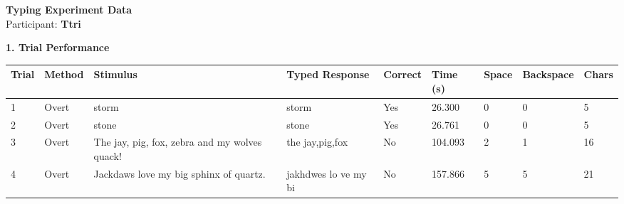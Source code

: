 \documentclass[10pt,a4paper]{article}
\begin{document}

\begin{center}
    {\Large\bfseries Typing Experiment Data}\\
    \vspace{2pt}
    Participant: \textbf{Ttri}
\end{center}

\vspace{0.25cm}


\noindent
{\large\bfseries 1. Trial Performance}

\vspace{0.08cm}

\begin{center}
\begin{tabularx}{\textwidth}{
    C{0.45in}
    C{0.65in}
    L{2.35in}
    L{2.55in}
    C{0.65in}
    C{0.65in}
    C{0.55in}
    C{0.75in}
    C{0.55in}
}
\toprule

\textbf{Trial} &
\textbf{Method} &
\textbf{Stimulus} &
\textbf{Typed Response} &
\textbf{Correct} &
\textbf{Time (s)} &
\textbf{Space} &
\textbf{Backspace} &
\textbf{Chars}
\\

\midrule

1 &
Overt &
storm &
storm &
Yes &
26.300 &
0 &
0 &
5
\\

2 &
Overt &
stone &
stone &
Yes &
26.761 &
0 &
0 &
5
\\

3 &
Overt &
The jay, pig, fox, zebra and my wolves quack! &
the  jay,pig,fox &
No &
104.093 &
2 &
1 &
16
\\

4 &
Overt &
Jackdaws love my big sphinx of quartz. &
jakhdwes lo ve my  bi &
No &
157.866 &
5 &
5 &
21
\\

\bottomrule
\end{tabularx}
\end{center}

\vspace{0.35cm}

\end{document}

